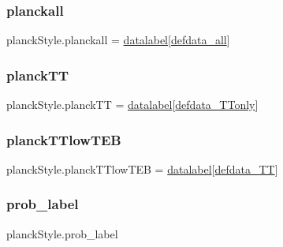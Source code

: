 \subsubsection{\texorpdfstring{planckall}{planckall}}
{\footnotesize\ttfamily planck\+Style.\+planckall = \mbox{\hyperlink{namespaceplanckStyle_a8da1128119eb2cdd66bc98e4099d374c}{datalabel}}\mbox{[}\mbox{\hyperlink{namespaceplanckStyle_ac23576e1aafe24fd074f5450debf6f14}{defdata\+\_\+all}}\mbox{]}}

\mbox{\label{namespaceplanckStyle_a12e3ad54c7c60504b71007e003962682}} 
\subsubsection{\texorpdfstring{planck\+TT}{planckTT}}
{\footnotesize\ttfamily planck\+Style.\+planck\+TT = \mbox{\hyperlink{namespaceplanckStyle_a8da1128119eb2cdd66bc98e4099d374c}{datalabel}}\mbox{[}\mbox{\hyperlink{namespaceplanckStyle_acce6d3fa6a00f16fb8bcdd3bd3aae9cd}{defdata\+\_\+\+T\+Tonly}}\mbox{]}}

\mbox{\label{namespaceplanckStyle_a73292a479098b19415c89415f648fe8e}} 
\subsubsection{\texorpdfstring{planck\+T\+Tlow\+T\+EB}{planckTTlowTEB}}
{\footnotesize\ttfamily planck\+Style.\+planck\+T\+Tlow\+T\+EB = \mbox{\hyperlink{namespaceplanckStyle_a8da1128119eb2cdd66bc98e4099d374c}{datalabel}}\mbox{[}\mbox{\hyperlink{namespaceplanckStyle_ae9a486070a1102293ca26bf924f115e2}{defdata\+\_\+\+TT}}\mbox{]}}

\mbox{\label{namespaceplanckStyle_a04f5998586e8cfb78e0d45335efc5d2d}} 
\subsubsection{\texorpdfstring{prob\+\_\+label}{prob\_label}}
{\footnotesize\ttfamily planck\+Style.\+prob\+\_\+label}

